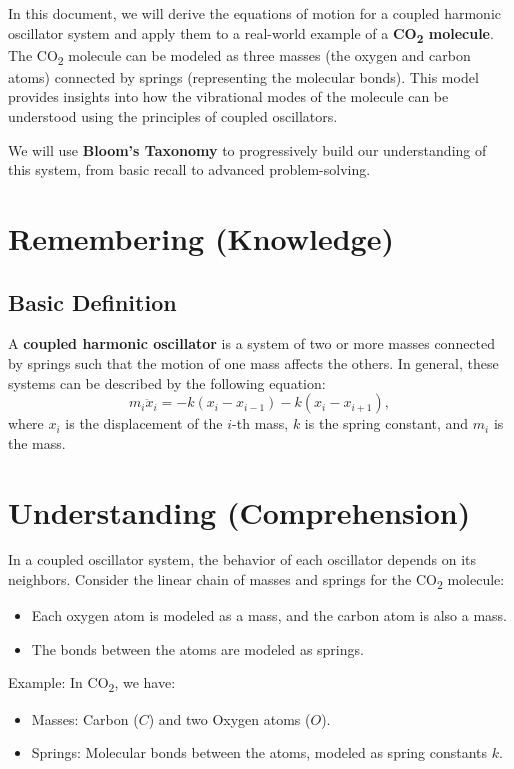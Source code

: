 \documentclass[16pt,a4paper]{article}
\begin{document}
In this document, we will derive the equations of motion for a coupled harmonic oscillator system and apply them to a real-world example of a \textbf{CO\textsubscript{2} molecule}. The CO\textsubscript{2} molecule can be modeled as three masses (the oxygen and carbon atoms) connected by springs (representing the molecular bonds). This model provides insights into how the vibrational modes of the molecule can be understood using the principles of coupled oscillators.

We will use \textbf{Bloom’s Taxonomy} to progressively build our understanding of this system, from basic recall to advanced problem-solving. 

\section{Remembering (Knowledge)}
\subsection{Basic Definition}
A \textbf{coupled harmonic oscillator} is a system of two or more masses connected by springs such that the motion of one mass affects the others. In general, these systems can be described by the following equation:
\begin{equation}
m_i \ddot{x}_i = -k(x_i - x_{i-1}) - k(x_i - x_{i+1}),
\end{equation}
where $x_i$ is the displacement of the $i$-th mass, $k$ is the spring constant, and $m_i$ is the mass.

\section{Understanding (Comprehension)}
In a coupled oscillator system, the behavior of each oscillator depends on its neighbors. Consider the linear chain of masses and springs for the CO\textsubscript{2} molecule:
\begin{itemize}
    \item Each oxygen atom is modeled as a mass, and the carbon atom is also a mass.
    \item The bonds between the atoms are modeled as springs.
\end{itemize}

Example:
In CO\textsubscript{2}, we have:
\begin{itemize}
    \item Masses: Carbon ($C$) and two Oxygen atoms ($O$).
    \item Springs: Molecular bonds between the atoms, modeled as spring constants $k$.
\end{itemize}
\end{document}
